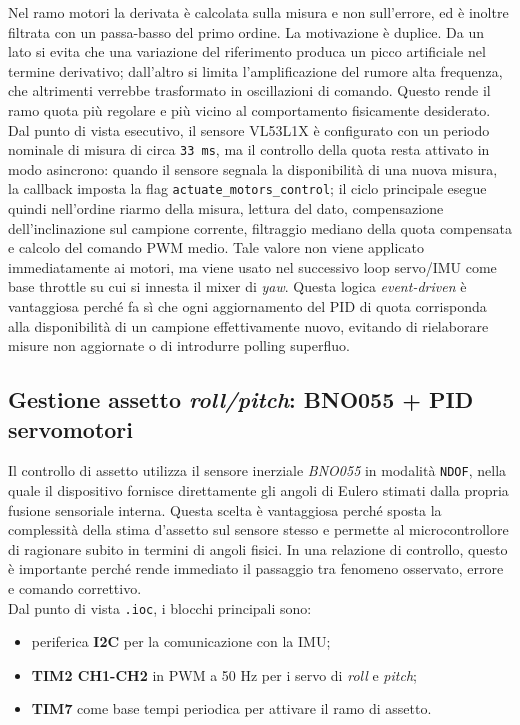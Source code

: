 \documentclass[11pt]{report}
\begin{document}
	Nel ramo motori la derivata è calcolata sulla misura e non sull'errore, ed è inoltre filtrata con un passa-basso del primo ordine. La motivazione è duplice. Da un lato si evita che una variazione del riferimento produca un picco artificiale nel termine derivativo; dall'altro si limita l'amplificazione del rumore alta frequenza, che altrimenti verrebbe trasformato in oscillazioni di comando. Questo rende il ramo quota più regolare e più vicino al comportamento fisicamente desiderato.\\
	Dal punto di vista esecutivo, il sensore VL53L1X è configurato con un periodo nominale di misura di circa \texttt{33 ms}, ma il controllo della quota resta attivato in modo asincrono: quando il sensore segnala la disponibilità di una nuova misura, la callback imposta la flag \texttt{actuate\_motors\_control}; il ciclo principale esegue quindi nell'ordine riarmo della misura, lettura del dato, compensazione dell'inclinazione sul campione corrente, filtraggio mediano della quota compensata e calcolo del comando PWM medio. Tale valore non viene applicato immediatamente ai motori, ma viene usato nel successivo loop servo/IMU come base throttle su cui si innesta il mixer di \textit{yaw}. Questa logica \textit{event-driven} è vantaggiosa perché fa sì che ogni aggiornamento del PID di quota corrisponda alla disponibilità di un campione effettivamente nuovo, evitando di rielaborare misure non aggiornate o di introdurre polling superfluo.
	
	
	
	\subsection{Gestione assetto \textit{roll/pitch}: BNO055 + PID servomotori}
	Il controllo di assetto utilizza il sensore inerziale \textit{BNO055} in modalità \texttt{NDOF}, nella quale il dispositivo fornisce direttamente gli angoli di Eulero stimati dalla propria fusione sensoriale interna. Questa scelta è vantaggiosa perché sposta la complessità della stima d'assetto sul sensore stesso e permette al microcontrollore di ragionare subito in termini di angoli fisici. In una relazione di controllo, questo è importante perché rende immediato il passaggio tra fenomeno osservato, errore e comando correttivo.\\
	Dal punto di vista \texttt{.ioc}, i blocchi principali sono:
	\begin{itemize}
		\item periferica \textbf{I2C} per la comunicazione con la IMU;
		\item \textbf{TIM2 CH1-CH2} in PWM a 50 Hz per i servo di \textit{roll} e \textit{pitch};
		\item \textbf{TIM7} come base tempi periodica per attivare il ramo di assetto.
	\end{itemize}
	
\end{document}
